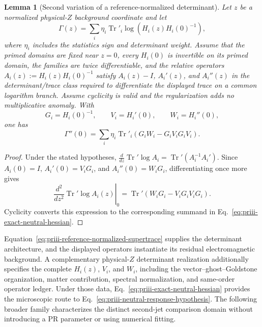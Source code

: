 \documentclass[11pt]{article}
\newtheorem{lemma}[theorem]{Lemma}
\begin{document}
\begin{lemma}[Second variation of a reference-normalized determinant]
\label{lem:priii-determinant-hessian}
Let \(z\) be a normalized physical-\(Z\) background coordinate and let
\begin{equation}
\Gamma(z)
=
\sum_i\eta_i\operatorname{Tr}'_i
\log\!\left(H_i(z)H_i(0)^{-1}\right),
\label{eq:priii-general-neutral-determinant}
\end{equation}
where \(\eta_i\) includes the statistics sign and determinant weight.  Assume that the primed
domains are fixed near \(z=0\), every \(H_i(0)\) is invertible on its primed domain, the families
are twice differentiable, and the relative operators
\(A_i(z):=H_i(z)H_i(0)^{-1}\) satisfy \(A_i(z)-I\), \(A_i'(z)\), and
\(A_i''(z)\) in the determinant/trace class required to differentiate the displayed trace on a
common logarithm branch.  Assume cyclicity is valid and the regularization adds no
multiplicative anomaly.  With
\begin{equation}
G_i=H_i(0)^{-1},
\qquad
V_i=H_i'(0),
\qquad
W_i=H_i''(0),
\end{equation}
one has
\begin{equation}
\Gamma''(0)
=
\sum_i\eta_i\operatorname{Tr}'_i
\left(G_iW_i-G_iV_iG_iV_i\right).
\label{eq:priii-exact-neutral-hessian}
\end{equation}
\end{lemma}

\begin{proof}
Under the stated hypotheses,
\(\frac{d}{dz}\operatorname{Tr}'\log A_i=\operatorname{Tr}'(A_i^{-1}A_i')\).
Since \(A_i(0)=I\), \(A_i'(0)=V_iG_i\), and \(A_i''(0)=W_iG_i\), differentiating once more gives
\begin{equation}
\left.\frac{d^2}{dz^2}\operatorname{Tr}'\log A_i(z)\right|_{0}
=
\operatorname{Tr}'\!\left(W_iG_i-V_iG_iV_iG_i\right).
\end{equation}
Cyclicity converts this expression to the corresponding summand in
Eq.~\eqref{eq:priii-exact-neutral-hessian}.
\end{proof}

Equation~\eqref{eq:priii-reference-normalized-supertrace} supplies the
determinant architecture, and the displayed operators instantiate its residual
electromagnetic background.  A complementary physical-$Z$ determinant
realization additionally specifies the complete $H_i(z)$, $V_i$, and $W_i$,
including the vector--ghost--Goldstone organization, matter contribution,
spectral normalization, and same-order operator ledger.  Under those data,
Eq.~\eqref{eq:priii-exact-neutral-hessian} provides the microscopic route to
Eq.~\eqref{eq:priii-neutral-response-hypothesis}.  The following broader family
characterizes the distinct second-jet comparison domain without introducing a
PR parameter or using numerical fitting.
\end{document}
